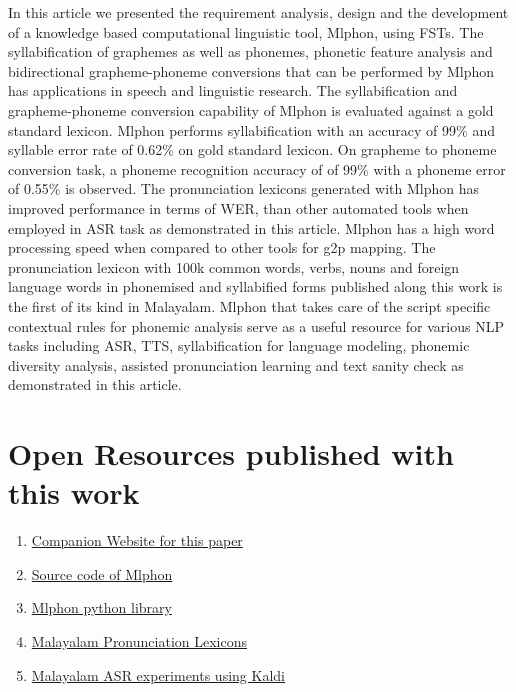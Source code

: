 \documentclass{ieeeaccess}
\begin{document}
In this article we presented the requirement analysis, design and the development of a knowledge based computational linguistic tool, Mlphon, using FSTs. The syllabification of graphemes as well as phonemes, phonetic feature analysis and bidirectional grapheme-phoneme conversions that can be performed by Mlphon has applications in speech and linguistic research. The syllabification and grapheme-phoneme conversion capability of Mlphon is evaluated against a gold standard lexicon. Mlphon performs syllabification with an  accuracy of 99\% and syllable error rate of 0.62\% on gold standard lexicon. On grapheme to phoneme conversion task, a phoneme recognition accuracy of of 99\%  with a phoneme error of  0.55\% is observed. The pronunciation lexicons generated with Mlphon has improved performance in terms of WER, than other automated tools when employed in ASR task as demonstrated in this article. Mlphon has a high word processing speed when compared to other tools for g2p mapping. The pronunciation lexicon with 100k common words, verbs, nouns and foreign language words in phonemised and syllabified forms published along this work is the first of its kind in Malayalam.  Mlphon that takes care of the script specific contextual rules for phonemic analysis serve as a useful resource for various NLP tasks including ASR, TTS, syllabification for language modeling, phonemic diversity analysis, assisted pronunciation learning and text sanity check as demonstrated in this article.
\appendices


\section{Open Resources published with this work}
\label{resources}
\begin{enumerate}
    \item \href{https://phon.smc.org.in/}{Companion Website for this paper} 
	\item \href{https://github.com/kavyamanohar/mlphon}{Source code of Mlphon}
	\item \href{https://pypi.org/project/mlphon/}{Mlphon python library}
	\item \href{https://gitlab.com/kavyamanohar/malayalam-phonetic-lexicon}{Malayalam Pronunciation Lexicons}
	\item \href{https://gitlab.com/kavyamanohar/asr-malayalam}{Malayalam ASR experiments using Kaldi}
\end{enumerate}


\end{document}
